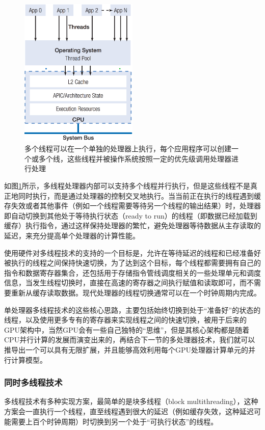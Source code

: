 \begin{figure}
	\sidecaption
	\includegraphics[width=0.5\textwidth]{figures/rp/multithreading}
	\caption{多个线程可以在一个单独的处理器上执行，每个应用程序可以创建一个或多个线，这些线程并被操作系统按照一定的优先级调用处理器进行处理}
	\label{f:rp-multithreading}
\end{figure}

如图\ref{f:rp-multithreading}所示，多线程处理器内部可以支持多个线程并行执行，但是这些线程不是真正地同时执行，而是通过处理器的控制交叉地执行。当当前正在执行的线程遇到缓存失效或者其他事件（例如一个线程需要等待另一个线程的输出结果）时，处理器即自动切换到其他处于等待执行状态（ready to run）的线程（即数据已经加载到缓存）执行指令，通过这样保持处理器的繁忙，避免处理器等待数据从主存读取的延迟，来充分提高单个处理器的计算性能。

使用硬件对多线程技术的支持的一个目标是，允许在等待延迟的线程和已经准备好被执行的线程之间保持快速切换，为了达到这个目标，每个线程都需要拥有自己的指令和数据寄存器集合，还包括用于存储指令管线调度相关的一些处理单元和调度信息，当发生线程切换时，直接在高速的寄存器之间执行赋值和读取即可，而不需要重新从缓存读取数据。现代处理器的线程切换通常可以在一个时钟周期内完成。

单处理器多线程技术的这些核心思路，主要包括始终切换到处于“准备好”的状态的线程，以及使用更多专有的寄存器来实现线程之间的快速切换，被用于后来的GPU架构中，当然GPU会有一些自己独特的“思维”，但是其核心架构都是随着CPU并行计算的发展而演变出来的，再结合下一节的多处理器技术，我们就可以推导出一个可以具有无限扩展，并且能够高效利用每个GPU处理器计算单元的并行计算模型。




\subsubsection{同时多线程技术}
多线程技术有多种实现方案，最简单的是块多线程（block multithreading），这种方案会一直执行一个线程，直至线程遇到很大的延迟（例如缓存失效，这种延迟可能需要上百个时钟周期）时切换到另一个处于“可执行状态”的线程。

